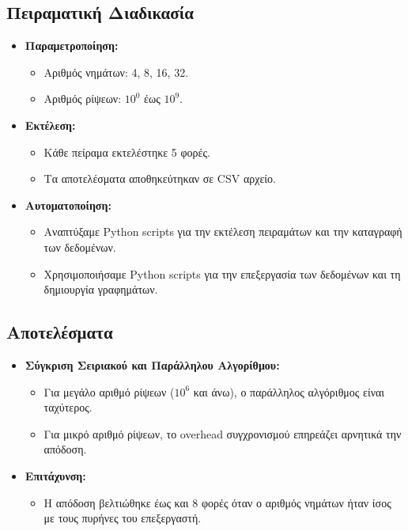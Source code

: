 \documentclass{article}
\begin{document}
\subsection*{Πειραματική Διαδικασία}
\begin{itemize}
    \item \textbf{Παραμετροποίηση:}
    \begin{itemize}
        \item Αριθμός νημάτων: 4, 8, 16, 32.
        \item Αριθμός ρίψεων: $10^0$ έως $10^{9}$.
    \end{itemize}
    \item \textbf{Εκτέλεση:}
    \begin{itemize}
        \item Κάθε πείραμα εκτελέστηκε 5 φορές.
        \item Τα αποτελέσματα αποθηκεύτηκαν σε CSV αρχείο.
    \end{itemize}
    \item \textbf{Αυτοματοποίηση:}
    \begin{itemize}
        \item Αναπτύξαμε Python scripts για την εκτέλεση πειραμάτων και την καταγραφή των δεδομένων.
        \item Χρησιμοποιήσαμε Python scripts για την επεξεργασία των δεδομένων και τη δημιουργία γραφημάτων.
    \end{itemize}
\end{itemize}
\subsection*{Αποτελέσματα}
\begin{itemize}
    \item \textbf{Σύγκριση Σειριακού και Παράλληλου Αλγορίθμου:}
    \begin{itemize}
        \item Για μεγάλο αριθμό ρίψεων ($10^6$ και άνω), ο παράλληλος αλγόριθμος είναι ταχύτερος.
        \item Για μικρό αριθμό ρίψεων, το overhead συγχρονισμού επηρεάζει αρνητικά την απόδοση.
    \end{itemize}
    \item \textbf{Επιτάχυνση:}
    \begin{itemize}
        \item Η απόδοση βελτιώθηκε έως και 8 φορές όταν ο αριθμός νημάτων ήταν ίσος με τους πυρήνες του επεξεργαστή.
    \end{itemize}
\end{itemize}
\end{document}
